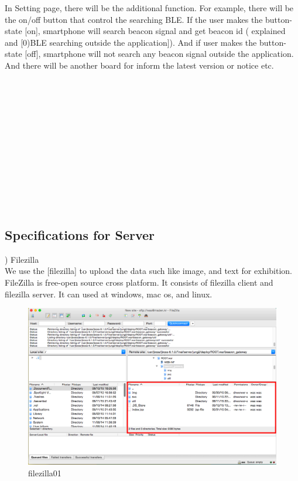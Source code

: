 \documentclass[conference]{IEEEtran}
\begin{document}
In Setting page, there will be the additional function. For example, there will be the on/off button that control the searching BLE. If the user makes the button-state [on], smartphone will search beacon signal and get beacon id ( explained and [0)BLE searching outside the application]). And if user makes the button-state [off], smartphone will not search any beacon signal outside the application. And there will be another board for inform the latest version or notice etc. \\\\\\\\\\\\\\\\\\\\\\\\\\

\subsection{Specifications for Server}

) Filezilla \\
We use the [filezilla] to upload the data such like image, and text for exhibition. FileZilla is free-open source cross platform. It consists of filezilla client and filezilla server. It can used at windows, mac os, and linux. \\


\begin{figure}[htbp]
\begin{center}
    \includegraphics[scale=0.2]{img_filezilla}
    \caption{filezilla01} 
\end{center}
\end{figure}
\end{document}
